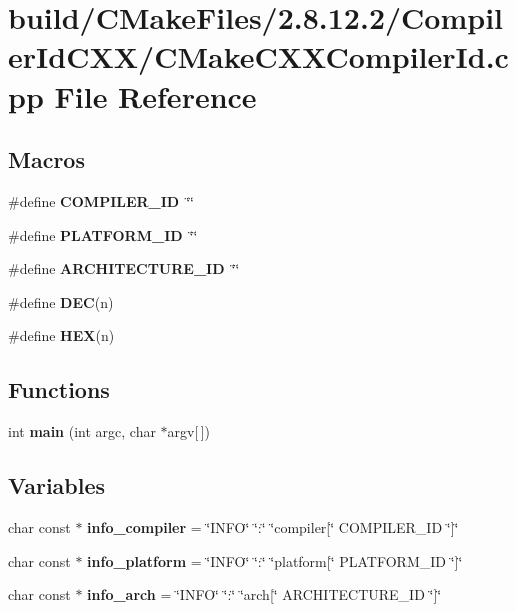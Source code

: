 \section{build/\-C\-Make\-Files/2.8.12.2/\-Compiler\-Id\-C\-X\-X/\-C\-Make\-C\-X\-X\-Compiler\-Id.cpp File Reference}
\label{CMakeCXXCompilerId_8cpp}
\subsection*{Macros}
\begin{DoxyCompactItemize}
\item 
\#define {\bf C\-O\-M\-P\-I\-L\-E\-R\-\_\-\-I\-D}~\char`\"{}\char`\"{}
\item 
\#define {\bf P\-L\-A\-T\-F\-O\-R\-M\-\_\-\-I\-D}~\char`\"{}\char`\"{}
\item 
\#define {\bf A\-R\-C\-H\-I\-T\-E\-C\-T\-U\-R\-E\-\_\-\-I\-D}~\char`\"{}\char`\"{}
\item 
\#define {\bf D\-E\-C}(n)
\item 
\#define {\bf H\-E\-X}(n)
\end{DoxyCompactItemize}
\subsection*{Functions}
\begin{DoxyCompactItemize}
\item 
int {\bf main} (int argc, char $\ast$argv[$\,$])
\end{DoxyCompactItemize}
\subsection*{Variables}
\begin{DoxyCompactItemize}
\item 
char const $\ast$ {\bf info\-\_\-compiler} = \char`\"{}I\-N\-F\-O\char`\"{} \char`\"{}\-:\char`\"{} \char`\"{}compiler[\char`\"{} C\-O\-M\-P\-I\-L\-E\-R\-\_\-\-I\-D \char`\"{}]\char`\"{}
\item 
char const $\ast$ {\bf info\-\_\-platform} = \char`\"{}I\-N\-F\-O\char`\"{} \char`\"{}\-:\char`\"{} \char`\"{}platform[\char`\"{} P\-L\-A\-T\-F\-O\-R\-M\-\_\-\-I\-D \char`\"{}]\char`\"{}
\item 
char const $\ast$ {\bf info\-\_\-arch} = \char`\"{}I\-N\-F\-O\char`\"{} \char`\"{}\-:\char`\"{} \char`\"{}arch[\char`\"{} A\-R\-C\-H\-I\-T\-E\-C\-T\-U\-R\-E\-\_\-\-I\-D \char`\"{}]\char`\"{}
\end{DoxyCompactItemize}


